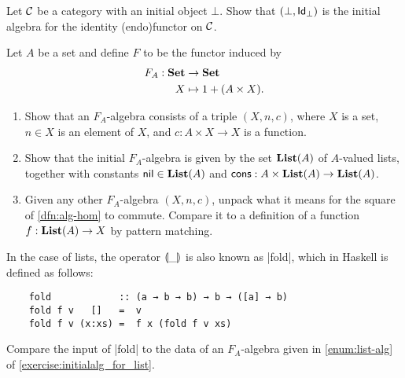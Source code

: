 \begin{exer}\label{exercise:initialalg_for_idfun_with_initialob} Let $\CC$ be a category with an initial object $\bot$. Show that $(\bot, \Id[\bot])$ is the initial algebra for the identity (endo)functor on $\CC$.
\end{exer}


\begin{exer}\label{exercise:initialalg_for_list}
  Let $A$ be a set and define $F$ to be the functor induced by 
\begin{align*}
  F_A:\SET &\to\SET
\\
  X &\mapsto 1 + (A\times X).
\end{align*}

\begin{enumerate}
\item \label{enum:list-alg} Show that an $F_A$-algebra consists of a triple $(X,n,c)$, where $X$ is a set, $n\in X$ is an element of $X$, and $c : A \times X \to X$ is a function.
\item Show that the initial $F_A$-algebra is given by the set $\List(A)$ of $A$-valued lists, together with constants $\nil \in \List(A)$ and $\cons : A \times \List(A) \to \List(A)$.
\item Given any other $F_A$-algebra $(X,n,c)$, unpack what it means for the square of \cref{dfn:alg-hom} to commute.
Compare it to a definition of a function $f : \List(A) \to X$ by pattern matching.
\end{enumerate}

\end{exer}

\begin{rem}
  In the case of lists, the operator $\catam{\_}$ is also known as |fold|, which in Haskell is defined as follows:
  \begin{lstlisting}
    fold            :: (a → b → b) → b → ([a] → b)
    fold f v   []   =  v
    fold f v (x:xs) =  f x (fold f v xs)
  \end{lstlisting}
  Compare the input of |fold| to the data of an $F_A$-algebra given in \cref{enum:list-alg} of \cref{exercise:initialalg_for_list}.
\end{rem}


